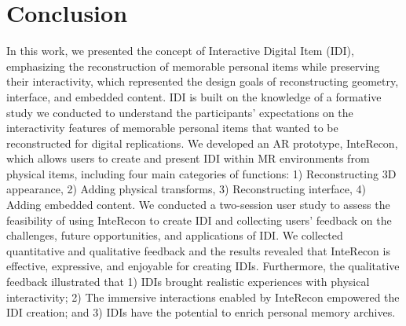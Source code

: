 \section{Conclusion}
In this work, we presented the concept of Interactive Digital Item (IDI), emphasizing the reconstruction of memorable personal items while preserving their interactivity, which represented the design goals of reconstructing geometry, interface, and embedded content.
IDI is built on the knowledge of a formative study we conducted to understand the participants' expectations on the interactivity features of memorable personal items that wanted to be reconstructed for digital replications.
We developed an AR prototype, InteRecon, which allows users to create and present IDI within MR environments from physical items, including four main categories of functions: 1) Reconstructing 3D appearance, 2) Adding physical transforms, 3) Reconstructing interface, 4) Adding embedded content.
We conducted a two-session user study to assess the feasibility of using InteRecon to create IDI and collecting users' feedback on the challenges, future opportunities,
and applications of IDI. 
We collected quantitative and qualitative feedback and the results revealed that InteRecon is effective, expressive, and enjoyable for creating IDIs. 
Furthermore, the qualitative feedback illustrated that 1) IDIs brought realistic experiences with physical interactivity; 2) The immersive interactions enabled by InteRecon empowered the IDI creation; and 3) IDIs have the potential to enrich personal memory archives.










